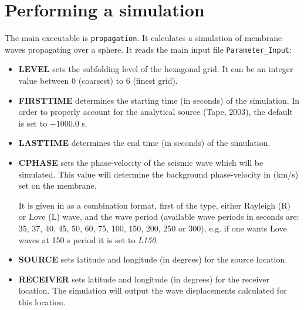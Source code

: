 \documentclass[a4paper,
                          headsepline,
                          listof=totoc,
                          toc=listof,
                          headings=small]{scrreprt} %
\begin{document}
\chapter{Performing a simulation}
The main executable is \texttt{propagation}.
It calculates a simulation of membrane waves propagating over a sphere.
It reads the main input file \texttt{Parameter\_Input}:
\\
\begin{itemize}
\item{\textbf{LEVEL}}
sets the subfolding level of the hexagonal grid. It can be an integer value
between $0$ (coarsest) to $6$ (finest grid).

\item \textbf{FIRSTTIME}
determines the starting time (in seconds) of the simulation. In order to properly account for the analytical source (Tape, 2003), the default is set to $-1000.0$ s.

\item \textbf{LASTTIME}
determines the end time (in seconds) of the simulation.

\item \textbf{CPHASE}
sets the phase-velocity of the seismic wave which will be simulated. This value
will determine the background phase-velocity in (km/s) set on the membrane.

It is given in as a combination format, first of the type, either Rayleigh (R) or Love (L) wave, and the wave period (available wave periods in seconds are: 35, 37, 40, 45, 50, 60, 75, 100, 150, 200, 250 or 300), e.g. if one wants Love waves at 150 s period it is set to \textit{L150}.

\item \textbf{SOURCE}
sets latitude and longitude (in degrees) for the source location.

\item \textbf{RECEIVER}
sets latitude and longitude (in degrees) for the receiver location.
The simulation will output the wave displacements calculated for this location.



\end{itemize}
\end{document}
